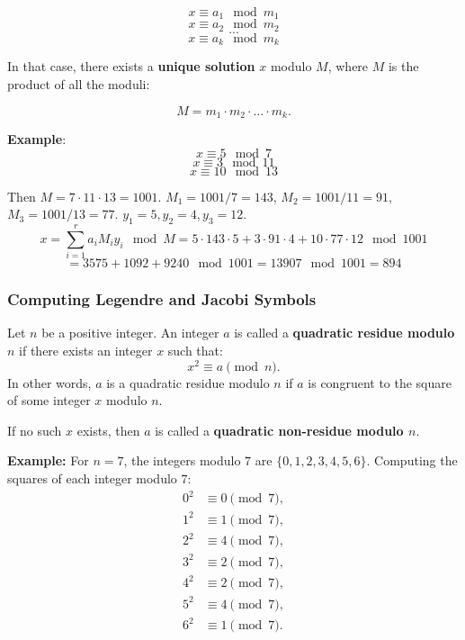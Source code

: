 \[ x \equiv a_1 \mod m_1 \] 
\[ x \equiv a_2 \mod m_2 \]
\[...\]
\[ x \equiv a_k \mod m_k \]

In that case, there exists a \textbf{unique solution} \(x\) modulo \(M\), where \(M\) is the product of all the moduli:

\[
M = m_1 \cdot m_2 \cdot \ldots \cdot m_k.
\]

\textbf{Example}:
\[x \equiv 5 \mod 7 \]
\[x \equiv 3 \mod 11 \]
\[x \equiv 10 \mod 13 \]

Then $ M = 7 \cdot 11 \cdot 13 = 1001$. $M_1 = 1001 \slash 7 = 143$, $M_2 = 1001 \slash 11 = 91$, $M_3 = 1001 \slash 13 = 77$. $y_1 = 5, y_2 = 4, y_3 = 12$.
\[ x = \sum^r_{i=1} a_iM_iy_i \mod M = 5 \cdot 143 \cdot 5 + 3 \cdot 91 \cdot 4 + 10 \cdot 77 \cdot 12 \mod 1001 \] 
\[= 3575 + 1092 + 9240 \mod 1001 = 13907 \mod 1001 = 894\]


\subsubsection{Computing Legendre and Jacobi Symbols}

\begin{defn}
    Let \( n \) be a positive integer. An integer \( a \) is called a \textbf{quadratic residue modulo \( n \)} if there exists an integer \( x \) such that:
    \[
    x^2 \equiv a \pmod{n}.
    \]
    In other words, \( a \) is a quadratic residue modulo \( n \) if \( a \) is congruent to the square of some integer \( x \) modulo \( n \).
    
    If no such \( x \) exists, then \( a \) is called a \textbf{quadratic non-residue modulo \( n \)}.    
\end{defn}

\textbf{Example:} For \( n = 7 \), the integers modulo \( 7 \) are \( \{ 0, 1, 2, 3, 4, 5, 6 \} \). Computing the squares of each integer modulo \( 7 \):
\[
\begin{aligned}
    0^2 &\equiv 0 \pmod{7}, \\
    1^2 &\equiv 1 \pmod{7}, \\
    2^2 &\equiv 4 \pmod{7}, \\
    3^2 &\equiv 2 \pmod{7}, \\
    4^2 &\equiv 2 \pmod{7}, \\
    5^2 &\equiv 4 \pmod{7}, \\
    6^2 &\equiv 1 \pmod{7}.
\end{aligned}
\]

